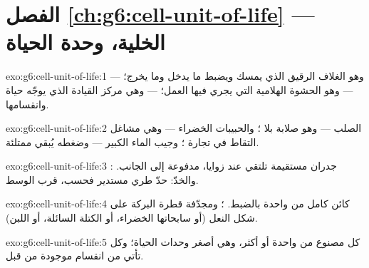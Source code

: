 \section*{الفصل \ref{ch:g6:cell-unit-of-life} --- الخلية، وحدة الحياة}

\begin{solution}{exo:g6:cell-unit-of-life:1}
 --- وهو الغلاف الرقيق الذي يمسك  ويضبط ما يدخل وما
يخرج؛  --- وهو الحشوة الهلامية التي يجري فيها العمل؛
 --- وهي مركز القيادة الذي يوجّه حياة  وانقسامها.
\end{solution}

\begin{solution}{exo:g6:cell-unit-of-life:2}
 الصلب --- وهو صلابة  بلا ؛ والحبيبات
الخضراء --- وهي مشاغل التقاط  في تجارة ؛ وجيب الماء
الكبير --- وضغطه يُبقي  ممتلئة.
\end{solution}

\begin{solution}{exo:g6:cell-unit-of-life:3}
: جدران مستقيمة تلتقي عند زوايا،  مدفوعة إلى الجانب.
والخدّ: حدّ طري مستدير  فحسب،  قرب الوسط.
\end{solution}

\begin{solution}{exo:g6:cell-unit-of-life:4}
كائن كامل من  واحدة بالضبط. ؛ ومجدّفة قطرة البركة على
شكل النعل (أو سابحاتها الخضراء، أو الكتلة السائلة، أو 
اللبن).
\end{solution}

\begin{solution}{exo:g6:cell-unit-of-life:5}
كل  مصنوع من  واحدة أو أكثر، وهي أصغر وحدات الحياة؛
وكل  تأتي من انقسام  موجودة من قبل.
\end{solution}

